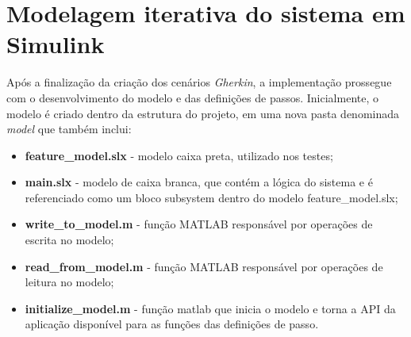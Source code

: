 

\section{Modelagem iterativa do sistema em Simulink}
\label{sbs:etapa5}

Após a finalização da criação dos cenários \textit{Gherkin}, a implementação prossegue com o desenvolvimento do modelo e das definições de passos. Inicialmente, o modelo é 
criado dentro da estrutura do projeto, em uma nova pasta denominada \textit{model} que também inclui:

\begin{itemize}
	\item \textbf{feature\_model.slx} - modelo caixa preta, utilizado nos testes;
	\item \textbf{main.slx} - modelo de caixa branca, que contém a lógica do sistema e é referenciado como um bloco subsystem dentro do modelo feature\_model.slx;
	\item \textbf{write\_to\_model.m} - função MATLAB responsável por operações de escrita no modelo;
	\item \textbf{read\_from\_model.m} - função MATLAB responsável por operações de leitura no modelo;
	\item \textbf{initialize\_model.m} - função matlab que inicia o modelo e torna a API da aplicação disponível para as funções das definições de passo.
\end{itemize}

